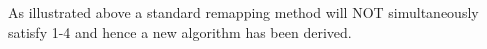






As illustrated above a standard remapping method will NOT simultaneously satisfy 1-4 and hence a new algorithm has been derived.

